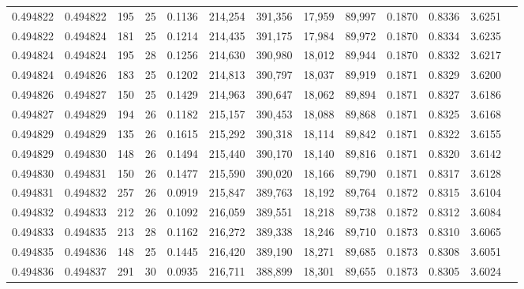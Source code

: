 \begin{tabular}{rrrrrrrrrrrrr}
0.494822 & 0.494822 & 195 &  25 &                                     0.1136 & 214,254 & 391,356 &  17,959 &  89,997 & 0.1870 & 0.8336 & 3.6251 \\
0.494822 & 0.494824 & 181 &  25 &                                     0.1214 & 214,435 & 391,175 &  17,984 &  89,972 & 0.1870 & 0.8334 & 3.6235 \\
0.494824 & 0.494824 & 195 &  28 &                                     0.1256 & 214,630 & 390,980 &  18,012 &  89,944 & 0.1870 & 0.8332 & 3.6217 \\
0.494824 & 0.494826 & 183 &  25 &                                     0.1202 & 214,813 & 390,797 &  18,037 &  89,919 & 0.1871 & 0.8329 & 3.6200 \\
0.494826 & 0.494827 & 150 &  25 &                                     0.1429 & 214,963 & 390,647 &  18,062 &  89,894 & 0.1871 & 0.8327 & 3.6186 \\
0.494827 & 0.494829 & 194 &  26 &                                     0.1182 & 215,157 & 390,453 &  18,088 &  89,868 & 0.1871 & 0.8325 & 3.6168 \\
0.494829 & 0.494829 & 135 &  26 &                                     0.1615 & 215,292 & 390,318 &  18,114 &  89,842 & 0.1871 & 0.8322 & 3.6155 \\
0.494829 & 0.494830 & 148 &  26 &                                     0.1494 & 215,440 & 390,170 &  18,140 &  89,816 & 0.1871 & 0.8320 & 3.6142 \\
0.494830 & 0.494831 & 150 &  26 &                                     0.1477 & 215,590 & 390,020 &  18,166 &  89,790 & 0.1871 & 0.8317 & 3.6128 \\
0.494831 & 0.494832 & 257 &  26 &                                     0.0919 & 215,847 & 389,763 &  18,192 &  89,764 & 0.1872 & 0.8315 & 3.6104 \\
0.494832 & 0.494833 & 212 &  26 &                                     0.1092 & 216,059 & 389,551 &  18,218 &  89,738 & 0.1872 & 0.8312 & 3.6084 \\
0.494833 & 0.494835 & 213 &  28 &                                     0.1162 & 216,272 & 389,338 &  18,246 &  89,710 & 0.1873 & 0.8310 & 3.6065 \\
0.494835 & 0.494836 & 148 &  25 &                                     0.1445 & 216,420 & 389,190 &  18,271 &  89,685 & 0.1873 & 0.8308 & 3.6051 \\
0.494836 & 0.494837 & 291 &  30 &                                     0.0935 & 216,711 & 388,899 &  18,301 &  89,655 & 0.1873 & 0.8305 & 3.6024 \\

\end{tabular}
